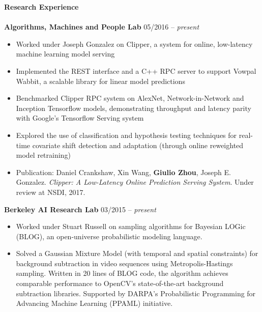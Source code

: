\documentclass{article}
\begin{document}
\noindent
\textbf{{\Large Research Experience}}\\[-2mm]
\HRule\\
\noindent
\textbf{Algorithms, Machines and People Lab}
\hfill 05/2016 -- \textit{present}
\begin{itemize}
\vspace{-1.8mm}
\item Worked under Joseph Gonzalez on Clipper, a system for online, low-latency machine learning model serving
\vspace{-2.5mm}
\item Implemented the REST interface and a C++ RPC server to support Vowpal Wabbit, a scalable library for linear model predictions
\vspace{-2.5mm}
\item Benchmarked Clipper RPC system on AlexNet, Network-in-Network and Inception Tensorflow models, demonstrating throughput and latency parity with Google's Tensorflow Serving system
\vspace{-2.5mm}
\item Explored the use of classification and hypothesis testing techniques for real-time covariate shift detection and adaptation (through online reweighted model retraining)
\vspace{-2.5mm}
\item Publication: Daniel Crankshaw, Xin Wang, \textbf{Giulio Zhou}, Joseph E. Gonzalez. \textit{Clipper: A Low-Latency Online Prediction Serving System}. Under review at NSDI, 2017. 
\end{itemize}

\noindent
\textbf{Berkeley AI Research Lab}
\hfill 03/2015 -- \textit{present}
\begin{itemize}
\vspace{-1.8mm}
\item Worked under Stuart Russell on sampling algorithms for Bayesian LOGic (BLOG), an open-universe probabilistic modeling language.
\vspace{-2.5mm}
\item Solved a Gaussian Mixture Model (with temporal and spatial constraints) for background subtraction in video sequences using Metropolis-Hastings sampling. Written in 20 lines of BLOG code, the algorithm achieves comparable performance to OpenCV's state-of-the-art background subtraction libraries. Supported by DARPA's Probabilistic Programming for Advancing Machine Learning (PPAML) initiative.
\end{itemize}
\end{document}

